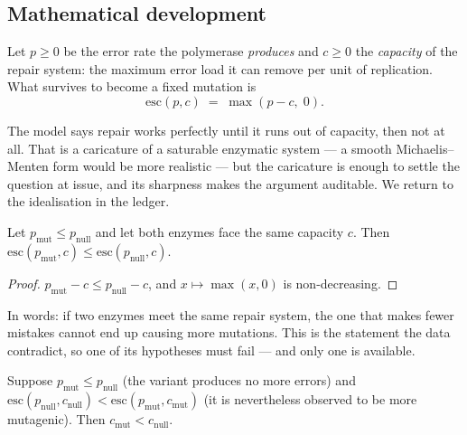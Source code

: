 \subsection{Mathematical development}

\begin{model}\label{model:channel}
Let $p \ge 0$ be the error rate the polymerase \emph{produces} and $c \ge 0$ the
\emph{capacity} of the repair system: the maximum error load it can remove per
unit of replication. What survives to become a fixed mutation is
\begin{equation}\label{eq:escaped}
  \mathrm{esc}(p, c) \;=\; \max(p - c,\; 0).
\end{equation}
\end{model}

The model says repair works perfectly until it runs out of capacity, then not at
all. That is a caricature of a saturable enzymatic system --- a smooth
Michaelis--Menten form would be more realistic --- but the caricature is enough to
settle the question at issue, and its sharpness makes the argument auditable. We
return to the idealisation in the ledger.

\begin{theorem}\label{thm:norev}
Let $p_{\mathrm{mut}} \le p_{\mathrm{null}}$ and let both enzymes face the same
capacity $c$. Then $\mathrm{esc}(p_{\mathrm{mut}}, c) \le \mathrm{esc}(p_{\mathrm{null}}, c)$.
\end{theorem}

\begin{proof}
$p_{\mathrm{mut}} - c \le p_{\mathrm{null}} - c$, and $x \mapsto \max(x, 0)$ is
non-decreasing.
\end{proof}

In words: if two enzymes meet the same repair system, the one that makes fewer
mistakes cannot end up causing more mutations. This is the statement the data
contradict, so one of its hypotheses must fail --- and only one is available.

\begin{theorem}\label{thm:forced}
Suppose $p_{\mathrm{mut}} \le p_{\mathrm{null}}$ (the variant produces no more
errors) and
$\mathrm{esc}(p_{\mathrm{null}}, c_{\mathrm{null}}) < \mathrm{esc}(p_{\mathrm{mut}}, c_{\mathrm{mut}})$
(it is nevertheless observed to be more mutagenic). Then
$c_{\mathrm{mut}} < c_{\mathrm{null}}$.
\end{theorem}

